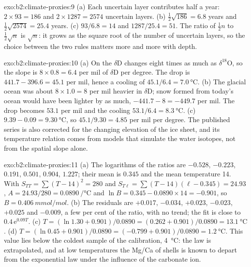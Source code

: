 \begin{solution}{exo:b2:climate-proxies:9}
(a) Each uncertain layer contributes half a year: $2 \times 93 = 186$ and $2 \times 1287 = 2574$
uncertain layers. (b) $\frac12\sqrt{186} = 6.8$ years and $\frac12\sqrt{2574} = 25.4$ years.
(c) $93/6.8 = 14$ and $1287/25.4 = 51$. The ratio of $\frac12 n$ to $\frac12\sqrt{n}$ is
$\sqrt{n}$: it grows as the square root of the number of uncertain layers, so the choice between
the two rules matters more and more with depth.
\end{solution}

\begin{solution}{exo:b2:climate-proxies:10}
(a) On the  $\delta$D changes eight times as much as $\delta^{18}$O, so the
slope is $8 \times 0.8 = 6.4$ per mil of $\delta$D per degree. The drop is $441.7 - 396.6 = 45.1$
per mil, hence a cooling of $45.1/6.4 = \qty{7.0}{\celsius}$. (b) The glacial ocean was about
$8 \times 1.0 = 8$ per mil heavier in $\delta$D; snow formed from today's ocean would have been
lighter by as much, $-441.7 - 8 = -449.7$ per mil. The drop becomes $53.1$ per mil and the cooling
$53.1/6.4 = \qty{8.3}{\celsius}$. (c) $9.39 - 0.09 = \qty{9.30}{\celsius}$, so $45.1/9.30 = 4.85$
per mil per degree. The published series is also corrected for the changing elevation of the ice
sheet, and its temperature relation comes from models that simulate the water isotopes, not from
the spatial slope alone.
\end{solution}

\begin{solution}{exo:b2:climate-proxies:11}
(a) The logarithms of the ratios are $-0.528$, $-0.223$, $0.191$, $0.501$, $0.904$, $1.227$; their
mean is $0.345$ and the mean temperature 14. With $S_{TT} = \sum (T - 14)^2 = 280$ and $S_{T\ell} =
\sum (T - 14)(\ell - 0.345) = 24.93$, $A = 24.93/280 = \qty{0.0890}{\per\celsius}$ and $\ln B =
0.345 - 0.0890 \times 14 = -0.901$, so $B = \qty{0.406}{mmol/mol}$. (b) The residuals are
$+0.017$, $-0.034$, $+0.023$, $-0.023$, $+0.025$ and $-0.009$, a few per cent of the ratio, with no
trend; the fit is close to $0.4\,\mathrm{e}^{0.09T}$. (c) $T = (\ln 1.30 + 0.901)/0.0890 = (0.262 +
0.901)/0.0890 = \qty{13.1}{\celsius}$. (d) $T = (\ln 0.45 + 0.901)/0.0890 = (-0.799 +
0.901)/0.0890 = \qty{1.2}{\celsius}$. This value lies below the coldest sample of the calibration,
\qty{4}{\celsius}: the law is extrapolated, and at low temperatures the Mg/Ca of shells is known to
depart from the exponential law under the influence of the carbonate ion.
\end{solution}

